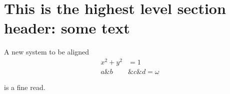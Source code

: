 \documentclass{article}
\begin{document}
\section{This is the highest level section header: some text}
\blindtext[1]

A new system to be aligned
\begin{align}
	x ^ 2 + y ^ 2 &= 1 \\
	a \& b &\& c \& d = \omega
\end{align}

\cite{CieslakEtAlStockReturns} is a fine read.

\printbibliography
\end{document}
